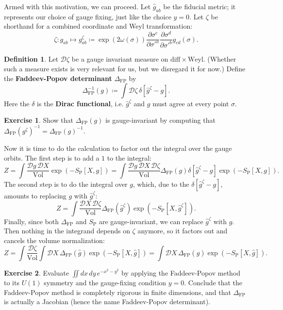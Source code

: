 \documentclass{report}
\theoremstyle{plain}
\theoremstyle{definition}
\newtheorem{definition}[theorem]{Definition}
\newtheorem{exercise}{Exercise}[section]
\theoremstyle{remark}
\newcommand{\cD}{\mathcal{D}}
\newcommand{\diff}{\mathrm{diff}}
\newcommand{\Weyl}{\mathrm{Weyl}}
\newcommand{\detFP}{\Delta_{\text{FP}}}
\DeclareMathOperator{\Vol}{Vol}
\newcommand{\pder}[2]{\frac{\partial #1}{\partial #2}}
\begin{document}
Armed with this motivation, we can proceed. Let $\hat{g}_{ab}$ be the
fiducial metric; it represents our choice of gauge fixing, just like
the choice $y = 0$. Let $\zeta$ be shorthand for a combined coordinate
and Weyl transformation:
\[ \zeta\colon g_{ab} \mapsto g^\zeta_{ab} \coloneqq \exp(2\omega(\sigma)) \pder{\sigma^c}{\sigma'^a} \pder{\sigma^d}{\sigma'^b} g_{cd}(\sigma). \]

\begin{definition}
  Let $\cD \zeta$ be a gauge invariant measure on $\diff \times
  \Weyl$. (Whether such a measure exists is very relevant for us, but
  we disregard it for now.) Define the {\bf Faddeev-Popov determinant}
  $\detFP$ by
  \[ \detFP^{-1}(g) \coloneqq \int \cD \zeta \, \delta[\hat{g}^\zeta - g]. \]
  Here the $\delta$ is the {\bf Dirac functional}, i.e.
  $\hat{g}^\zeta$ and $g$ must agree at every point $\sigma$.
\end{definition}

\begin{exercise}
  Show that $\detFP(g)$ is gauge-invariant by computing that
  $\detFP(g^\zeta)^{-1} = \detFP(g)^{-1}$.
\end{exercise}

Now it is time to do the calculation to factor out the integral over
the gauge orbits. The first step is to add a $1$ to the integral:
\[ Z = \int \frac{\cD g \, \cD X}{\Vol} \exp(-S_{\text{P}}[X, g]) = \int \frac{\cD g \, \cD X \, \cD \zeta}{\Vol} \detFP(g) \delta[\hat{g}^\zeta - g] \exp(-S_{\text{P}}[X, g]). \]
The second step is to do the integral over $g$, which, due to the
$\delta[\hat{g}^\zeta - g]$, amounts to replacing $g$ with
$\hat{g}^\zeta$:
\[ Z = \int \frac{\cD X \, \cD \zeta}{\Vol} \detFP(\hat{g}^\zeta)\exp(-S_{\text{P}}[X, \hat{g}^\zeta]). \]
Finally, since both $\detFP$ and $S_{\text{P}}$ are gauge-invariant,
we can replace $\hat{g}^\zeta$ with $\hat{g}$. Then nothing in the
integrand depends on $\zeta$ anymore, so it factors out and cancels
the volume normalization:
\[ Z = \int \frac{\cD \zeta}{\Vol} \int \cD X \, \detFP(\hat{g}) \exp(-S_{\text{P}}[X, \hat{g}]) = \int \cD X \, \detFP(\hat{g}) \exp(-S_{\text{P}}[X, \hat{g}]). \]

\begin{exercise}
  Evaluate $\iint dx \, dy \, e^{-x^2 - y^2}$ by applying the
  Faddeev-Popov method to its $U(1)$ symmetry and the gauge-fixing
  condition $y = 0$. Conclude that the Faddeev-Popov method is
  completely rigorous in finite dimensions, and that $\detFP$ is
  actually a Jacobian (hence the name Faddeev-Popov determinant).
\end{exercise}
\end{document}
